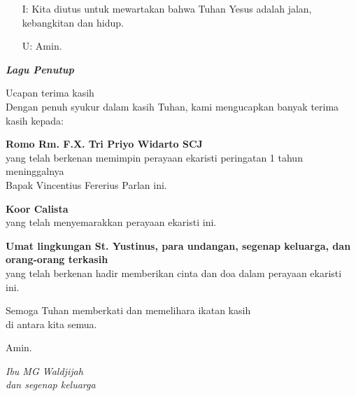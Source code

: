 \documentclass[titlepage,10pt,openany]{scrbook}
\makeatletter
\newcommand{\lagu}[1]{%
  {\parindent \z@ 
    \interlinepenalty\@M \slshape \bfseries \normalsize \textit{#1}\par\nobreak \vskip 10\p@ }}
\newcommand{\BU}[1]{\begin{itemize} \item[U:] #1 \end{itemize}}
\newcommand{\BI}[1]{\begin{itemize} \item[I:] #1 \end{itemize}}
\newcommand{\namaalm}{Bapak Vincentius Fererius Parlan }
\newcommand{\namaromo}{Rm. F.X. Tri Priyo Widarto SCJ}
\makeatother
\begin{document}
\BI{Kita diutus untuk mewartakan bahwa Tuhan Yesus adalah 
jalan, kebangkitan dan hidup.}

\BU{Amin.}

 

\lagu{Lagu Penutup}

\vspace{1cm}

 

\newpage
\begin{flushright}
{\Large Ucapan terima kasih}\\
\noindent Dengan penuh syukur dalam kasih Tuhan, kami mengucapkan banyak
terima kasih kepada:
\large

\textbf{Romo \namaromo}\\
yang telah berkenan memimpin perayaan ekaristi peringatan 1 tahun meninggalnya\\ \namaalm
ini.

\textbf{Koor Calista}\\
yang telah menyemarakkan perayaan ekaristi ini.

\textbf{Umat lingkungan St. Yustinus, para undangan, segenap keluarga, dan orang-orang terkasih}\\
yang telah berkenan hadir memberikan cinta dan doa dalam perayaan
ekaristi ini.

Semoga Tuhan memberkati dan memelihara ikatan kasih\\ di antara kita semua.

Amin.

\bigskip 

\textit{Ibu MG Waldjijah\\
dan segenap keluarga}
\end{flushright}
\end{document}
